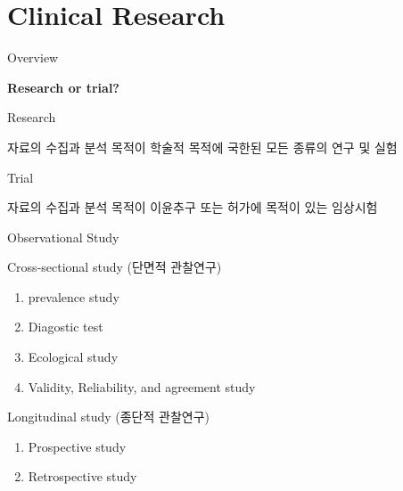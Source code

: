 \documentclass[9pt,ignorenonframetext,xcolor=dvipsnames]{beamer}
\providecommand{\tightlist}{%
  \setlength{\itemsep}{0pt}\setlength{\parskip}{0pt}}
\newlength{\wideitemsep}
\let\olditem\item
\renewcommand{\item}{\setlength{\itemsep}{\wideitemsep}\olditem}
\begin{document}
\section{Clinical Research}\label{clinical-research}

\begin{frame}{Overview}

\LARGE{\textbf{Research or trial?}}

\begin{block}{Research}

\normalsize{자료의 수집과 분석 목적이 학술적 목적에 국한된 모든 종류의 연구 및 실험}

\end{block}

\begin{block}{Trial}

\normalsize{자료의 수집과 분석 목적이 이윤추구 또는 허가에 목적이 있는 임상시험}

\end{block}

\end{frame}

\begin{frame}{Observational Study}

\begin{block}{Cross-sectional study (단면적 관찰연구)}

\begin{enumerate}
\def\labelenumi{\arabic{enumi}.}
\tightlist
\item
  prevalence study
\item
  Diagostic test
\item
  Ecological study
\item
  Validity, Reliability, and agreement study
\end{enumerate}

\end{block}

\begin{block}{Longitudinal study (종단적 관찰연구)}

\begin{enumerate}
\def\labelenumi{\arabic{enumi}.}
\tightlist
\item
  Prospective study
\item
  Retrospective study
\end{enumerate}

\end{block}

\end{frame}
\end{document}
